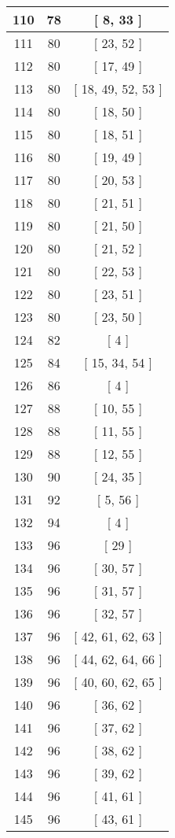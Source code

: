 \begin{center}
\begin{longtable}[H]{|| c c c ||}
\hline
110 & 78 & [ 8, 33 ] \\ 
\hline
111 & 80 & [ 23, 52 ] \\ 
\hline
112 & 80 & [ 17, 49 ] \\ 
\hline
113 & 80 & [ 18, 49, 52, 53 ] \\ 
\hline
114 & 80 & [ 18, 50 ] \\ 
\hline
115 & 80 & [ 18, 51 ] \\ 
\hline
116 & 80 & [ 19, 49 ] \\ 
\hline
117 & 80 & [ 20, 53 ] \\ 
\hline
118 & 80 & [ 21, 51 ] \\ 
\hline
119 & 80 & [ 21, 50 ] \\ 
\hline
120 & 80 & [ 21, 52 ] \\ 
\hline
121 & 80 & [ 22, 53 ] \\ 
\hline
122 & 80 & [ 23, 51 ] \\ 
\hline
123 & 80 & [ 23, 50 ] \\ 
\hline
124 & 82 & [ 4 ] \\ 
\hline
125 & 84 & [ 15, 34, 54 ] \\ 
\hline
126 & 86 & [ 4 ] \\ 
\hline
127 & 88 & [ 10, 55 ] \\ 
\hline
128 & 88 & [ 11, 55 ] \\ 
\hline
129 & 88 & [ 12, 55 ] \\ 
\hline
130 & 90 & [ 24, 35 ] \\ 
\hline
131 & 92 & [ 5, 56 ] \\ 
\hline
132 & 94 & [ 4 ] \\ 
\hline
133 & 96 & [ 29 ] \\ 
\hline
134 & 96 & [ 30, 57 ] \\ 
\hline
135 & 96 & [ 31, 57 ] \\ 
\hline
136 & 96 & [ 32, 57 ] \\ 
\hline
137 & 96 & [ 42, 61, 62, 63 ] \\ 
\hline
138 & 96 & [ 44, 62, 64, 66 ] \\ 
\hline
139 & 96 & [ 40, 60, 62, 65 ] \\ 
\hline
140 & 96 & [ 36, 62 ] \\ 
\hline
141 & 96 & [ 37, 62 ] \\ 
\hline
142 & 96 & [ 38, 62 ] \\ 
\hline
143 & 96 & [ 39, 62 ] \\ 
\hline
144 & 96 & [ 41, 61 ] \\ 
\hline
145 & 96 & [ 43, 61 ] \\ 

\end{longtable}
\end{center}
